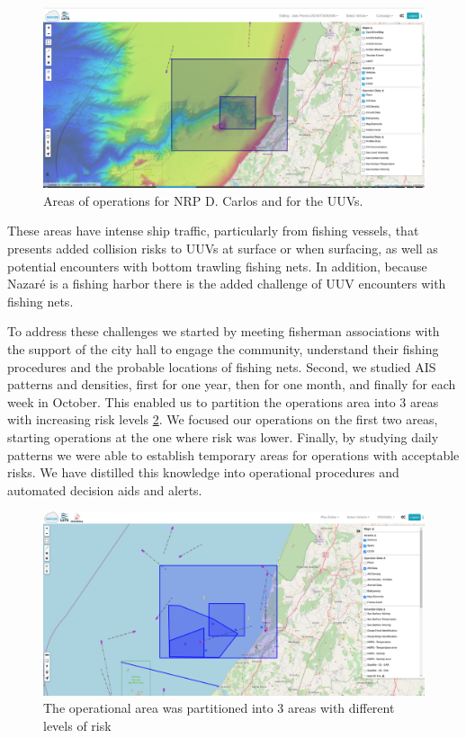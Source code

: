 \begin{figure}
    \centering
    \includegraphics[width=.7\linewidth]{fig/Opareaas.png}
    \caption{Areas of operations for NRP D. Carlos and for the UUVs.}
    \label{fig:opareas}
\end{figure}

These areas have intense ship traffic, particularly from fishing vessels, that presents added collision risks to UUVs at surface or when surfacing, as well as potential encounters with bottom trawling fishing nets. In addition, because Nazaré is a fishing harbor there is the added challenge of UUV encounters with fishing nets.

To address these challenges we started by meeting fisherman associations with the support of the city hall to engage the community, understand their fishing procedures and the probable locations of fishing nets. Second, we studied AIS patterns and densities, first for one year, then for one month, and finally for each week in October. This enabled us to partition the operations area into 3 areas with increasing risk levels \ref{fig:riskareas}. We focused our operations on the first two areas, starting operations at the one where risk was lower. Finally, by studying daily patterns we were able to establish temporary areas for operations with acceptable risks. We have distilled this knowledge into operational procedures and automated decision aids and alerts.

\begin{figure}
    \centering
    \includegraphics[width=.7\linewidth]{fig/riskareas.png}
    \caption{The operational area was partitioned into 3 areas with different levels of risk}
    \label{fig:riskareas}
\end{figure}

